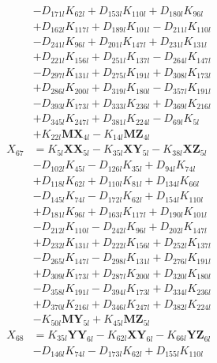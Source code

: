 \begin{multicols}{2}
\begin{align}
&- D_{171l}K_{62l} + D_{153l}K_{110l} + D_{180l}K_{96l}  \nonumber \\
&+ D_{162l}K_{117l} + D_{189l}K_{101l} - D_{211l}K_{110l}  \nonumber \\
&- D_{241l}K_{96l} + D_{201l}K_{147l} + D_{231l}K_{131l}  \nonumber \\
&+ D_{221l}K_{156l} + D_{251l}K_{137l} - D_{264l}K_{147l}  \nonumber \\
&- D_{297l}K_{131l} + D_{275l}K_{191l} + D_{308l}K_{173l}  \nonumber \\
&+ D_{286l}K_{200l} + D_{319l}K_{180l} - D_{357l}K_{191l}  \nonumber \\
&- D_{393l}K_{173l} + D_{333l}K_{236l} + D_{369l}K_{216l}  \nonumber \\
&+ D_{345l}K_{247l} + D_{381l}K_{224l} - D_{69l}K_{5l}  \nonumber \\
&+ K_{22l}\mathbf{MX}_{4l} - K_{14l}\mathbf{MZ}_{4l} \nonumber \\
X_{67} &= K_{5l}\mathbf{XX}_{5l} - K_{35l}\mathbf{XY}_{5l} - K_{38l}\mathbf{XZ}_{5l}  \nonumber \\
&- D_{102l}K_{45l} - D_{126l}K_{35l} + D_{94l}K_{74l}  \nonumber \\
&+ D_{118l}K_{62l} + D_{110l}K_{81l} + D_{134l}K_{66l}  \nonumber \\
&- D_{145l}K_{74l} - D_{172l}K_{62l} + D_{154l}K_{110l}  \nonumber \\
&+ D_{181l}K_{96l} + D_{163l}K_{117l} + D_{190l}K_{101l}  \nonumber \\
&- D_{212l}K_{110l} - D_{242l}K_{96l} + D_{202l}K_{147l}  \nonumber \\
&+ D_{232l}K_{131l} + D_{222l}K_{156l} + D_{252l}K_{137l}  \nonumber \\
&- D_{265l}K_{147l} - D_{298l}K_{131l} + D_{276l}K_{191l}  \nonumber \\
&+ D_{309l}K_{173l} + D_{287l}K_{200l} + D_{320l}K_{180l}  \nonumber \\
&- D_{358l}K_{191l} - D_{394l}K_{173l} + D_{334l}K_{236l}  \nonumber \\
&+ D_{370l}K_{216l} + D_{346l}K_{247l} + D_{382l}K_{224l}  \nonumber \\
&- K_{50l}\mathbf{MY}_{5l} + K_{45l}\mathbf{MZ}_{5l} \nonumber \\
X_{68} &= K_{35l}\mathbf{YY}_{6l} - K_{62l}\mathbf{XY}_{6l} - K_{66l}\mathbf{YZ}_{6l}  \nonumber \\
&- D_{146l}K_{74l} - D_{173l}K_{62l} + D_{155l}K_{110l}  \nonumber \\

\end{align}
\end{multicols}
